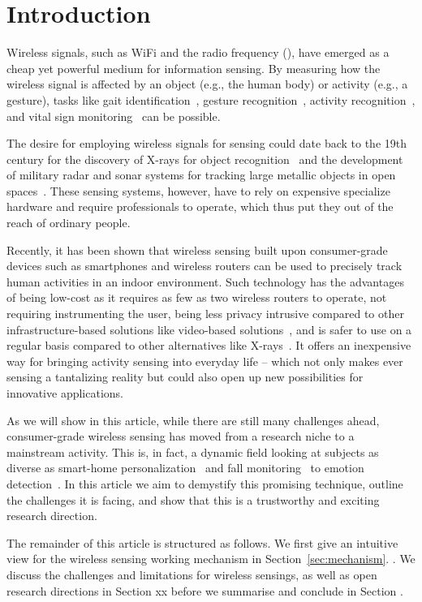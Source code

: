 \section{Introduction}
Wireless signals, such as WiFi and the radio frequency (\RF), have emerged as a cheap yet powerful medium for information sensing. By
measuring how the wireless signal is affected by an object (e.g., the human body) or activity (e.g., a gesture), tasks like gait
identification~\cite{}, gesture recognition~\cite{}, activity recognition~\cite{}, and vital sign monitoring~\cite{} can be possible.


The desire for employing wireless signals for sensing could date back to the 19th century  for the discovery of X-rays for object
recognition~\cite{} and the development of military radar and sonar systems for tracking large metallic objects in open
spaces~\cite{Charles Samuel Franklin 's development of first practcial radar}. These sensing systems, however, have to rely on expensive
specialize hardware and require professionals to operate, which thus put they out of the reach of ordinary people.



Recently, it has been shown that wireless sensing built upon consumer-grade devices such as smartphones and wireless routers can be used to
precisely track human activities in an indoor environment. Such technology has the advantages of being low-cost as it requires as few as
two wireless routers to operate, not requiring instrumenting the user, being less privacy intrusive compared to other infrastructure-based
solutions like video-based solutions~\cite{}, and is safer to use on a regular basis compared to other alternatives like X-rays~\cite{}. It
offers an inexpensive way for bringing activity sensing into everyday life -- which not only makes ever sensing a tantalizing reality but
could also open up new possibilities for innovative applications.


As we will show in this article, while there are still many challenges ahead, consumer-grade wireless sensing has moved from a research
niche to a mainstream activity. This is, in fact, a dynamic field looking at subjects as diverse as smart-home personalization~\cite{} and
fall monitoring~\cite{} to emotion detection~\cite{}. In this article we aim to demystify this promising technique, outline the challenges
it is facing, and show that this is a trustworthy and exciting research direction.




The remainder of this article is structured as follows. We first give an intuitive view for the wireless sensing working mechanism  in
Section~\ref{sec:mechanism}. . We discuss the challenges and limitations for wireless sensings, as
well as open research directions in Section xx before we summarise and conclude in Section .


